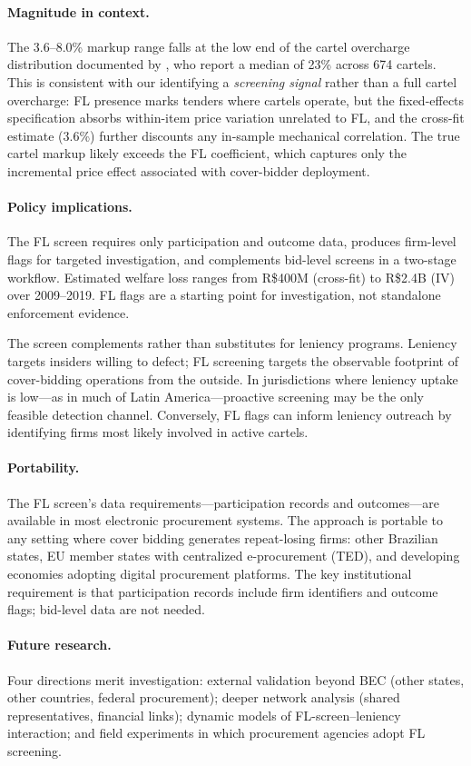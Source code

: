\paragraph{Magnitude in context.}
The 3.6--8.0\% markup range falls at the low end of the cartel
overcharge distribution documented by \citet{connor2007price}, who
report a median of 23\% across 674 cartels. This is consistent with
our identifying a \emph{screening signal} rather than a full cartel
overcharge: FL presence marks tenders where cartels operate, but
the fixed-effects specification absorbs within-item price variation
unrelated to FL, and the cross-fit estimate (3.6\%) further
discounts any in-sample mechanical correlation. The true cartel
markup likely exceeds the FL coefficient, which captures only the
incremental price effect associated with cover-bidder deployment.

\paragraph{Policy implications.}
The FL screen requires only participation and outcome data, produces
firm-level flags for targeted investigation, and complements bid-level
screens in a two-stage workflow. Estimated welfare loss ranges from
R\$400M (cross-fit) to R\$2.4B (IV) over 2009--2019. FL flags are a
starting point for investigation, not standalone enforcement evidence.

The screen complements rather than substitutes for leniency programs.
Leniency targets insiders willing to defect; FL screening targets
the observable footprint of cover-bidding operations from the outside.
In jurisdictions where leniency uptake is low---as in much of Latin
America---proactive screening may be the only feasible detection
channel. Conversely, FL flags can inform leniency outreach by
identifying firms most likely involved in active cartels.

\paragraph{Portability.}
The FL screen's data requirements---participation records and
outcomes---are available in most electronic procurement systems.
The approach is portable to any setting where cover bidding
generates repeat-losing firms: other Brazilian states, EU member
states with centralized e-procurement (TED), and developing economies
adopting digital procurement platforms. The key institutional
requirement is that participation records include firm identifiers
and outcome flags; bid-level data are not needed.

\paragraph{Future research.}
Four directions merit investigation: external validation beyond BEC
(other states, other countries, federal procurement);
deeper network analysis (shared representatives, financial links);
dynamic models of FL-screen--leniency interaction; and field
experiments in which procurement agencies adopt FL screening.
